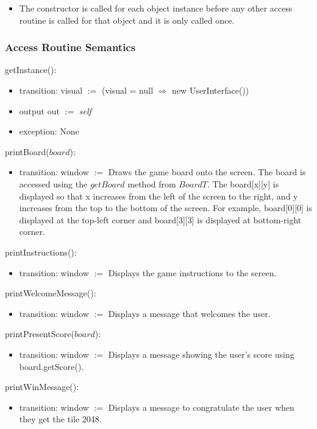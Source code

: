 \documentclass[12pt]{article}
\begin{document}
\begin{itemize}
\item The constructor is called for each object instance before any
other access routine is called for that object and it is only called once.
\end{itemize}
\subsubsection* {Access Routine Semantics}

\noindent getInstance():
\begin{itemize}
  \item transition: visual $:=$ (visual = null $\Rightarrow$ new UserInterface())
  \item output out $:=$ \textit{self}
  \item exception: None
\end{itemize}


\noindent printBoard($board$):
\begin{itemize}
\item transition: window $:=$ Draws the game board onto the screen. The board is accessed using the $getBoard$ method from $BoardT$. The board[x][y] is displayed so that x increases from the left of the screen to the right, and y increases from the top to the bottom of the screen. For example, board[0][0] is displayed at the top-left corner and board[3][3] is displayed at bottom-right corner. 
\end{itemize}

\noindent printInstructions():
\begin{itemize}
\item transition: window $:=$ Displays the game instructions to the screen.
\end{itemize}

\noindent printWelcomeMessage():
\begin{itemize}
\item transition: window $:=$ Displays a message that welcomes the user.
\end{itemize}

\noindent printPresentScore($board$):
\begin{itemize}
\item transition: window $:=$ Displays a message showing the user's score using board.getScore().
\end{itemize}

\noindent printWinMessage():
\begin{itemize}
\item transition: window $:=$ Displays a message to congratulate the user when they get the tile 2048.
\end{itemize}
\end{document}
